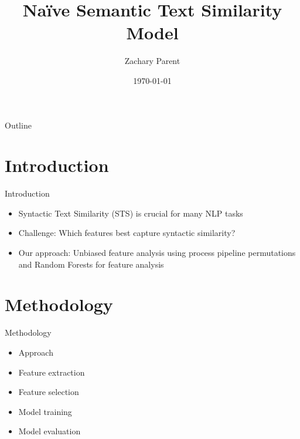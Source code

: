 \documentclass{beamer}
\title{Naïve Semantic Text Similarity Model}
\author{Zachary Parent}
\institute{UPC}
\date{\today}
\begin{document}
\begin{frame}
    \titlepage
\end{frame}

\begin{frame}{Outline}
    \tableofcontents
\end{frame}

\section{Introduction}
\begin{frame}{Introduction}
    \begin{itemize}
        \item Syntactic Text Similarity (STS) is crucial for many NLP tasks
        \item Challenge: Which features best capture syntactic similarity? \cite{10.5555/2387636.2387697}
        \item Our approach: Unbiased feature analysis using process pipeline permutations and Random Forests for feature analysis
    \end{itemize}
\end{frame}

\section{Methodology}
\begin{frame}{Methodology}
    \begin{itemize}
        \item Approach
        \item Feature extraction
        \item Feature selection
        \item Model training
        \item Model evaluation
    \end{itemize}
\end{frame}
\end{document}
